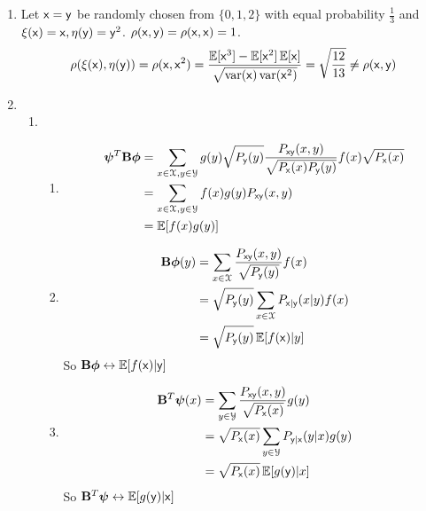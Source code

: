 \documentclass[a4paper]{article}
\begin{document}
\begin{enumerate}
  \item Let $\mathsf{x}=\mathsf{y}$ be randomly chosen from $\{0,1,2\}$ with equal probability $\frac{1}{3}$ and $\xi(\mathsf{x})=\mathsf{x},\eta(\mathsf{y}) = \mathsf{y}^2$. $\rho(\mathsf{x},\mathsf{y}) =\rho(\mathsf{x},\mathsf{x}) =1$. \begin{equation}
    \rho(\xi(\mathsf{x}),\eta(\mathsf{y})) = \rho(\mathsf{x},\mathsf{x}^2) = \frac{\operatorname{\mathbb{E}}[\mathsf{x}^3] - \operatorname{\mathbb{E}}[\mathsf{x}^2]\operatorname{\mathbb{E}}[\mathsf{x}]}{\sqrt{\operatorname{var}(\mathsf{x})\operatorname{var}(\mathsf{x}^2)}} = \sqrt{\frac{12}{13}} \neq \rho(\mathsf{x},\mathsf{y})
  \end{equation}

  \item \begin{enumerate}
    \item \begin{enumerate}
      \item \begin{equation}
        \begin{aligned}
          \bm{\psi}^T \mathbf{B} \bm{\phi} & =  \sum_{x\in \mathcal{X},y \in \mathcal{Y}} g(y) \sqrt{P_{\mathsf{y}}(y) } \frac{P_{\mathsf{x}\mathsf{y}}(x,y)}{\sqrt{P_{\mathsf{x}}(x)P_{\mathsf{y}}(y)}} f(x) \sqrt{P_{\mathsf{x}}(x)} \\
          & = \sum_{x\in \mathcal{X},y \in \mathcal{Y}} f(x) g(y) P_{\mathsf{x}\mathsf{y}}(x,y) \\
          & = \operatorname{\mathbb{E}}[f(x)g(y)]
        \end{aligned}
      \end{equation}
      \item \begin{equation}
        \begin{aligned}
          \mathbf{B} \bm{\phi}(y) & = \sum_{x\in \mathcal{X}} \frac{P_{\mathsf{x}\mathsf{y}}(x,y)}{\sqrt{P_{\mathsf{y}}(y)}} f(x) \\
          & =  \sqrt{P_{\mathsf{y}}(y)} \sum_{x\in \mathcal{X}} P_{\mathsf{x} | \mathsf{y}}(x|y) f(x) \\
          & = \sqrt{P_{\mathsf{y}}(y)} \operatorname{\mathbb{E}}[f(\mathsf{x}) | y]
        \end{aligned}
      \end{equation}
      So $\mathbf{B} \bm{\phi} \leftrightarrow \operatorname{\mathbb{E}}[f(\mathsf{x}) | \mathsf{y}]$
      \item  \begin{equation}
        \begin{aligned}
          \mathbf{B}^T \bm{\psi}(x) & = \sum_{y\in \mathcal{Y}} \frac{P_{\mathsf{x}\mathsf{y}}(x,y)}{\sqrt{P_{\mathsf{x}}(x)}} g(y) \\
          & =  \sqrt{P_{\mathsf{x}}(x)} \sum_{y\in \mathcal{Y}} P_{\mathsf{y} | \mathsf{x}}(y|x) g(y) \\
          & = \sqrt{P_{\mathsf{x}}(x)} \operatorname{\mathbb{E}}[g(\mathsf{y}) | x]
        \end{aligned}
      \end{equation}
      So $\mathbf{B}^T \bm{\psi} \leftrightarrow \operatorname{\mathbb{E}}[g(\mathsf{y}) | \mathsf{x}]$
    \end{enumerate}


\end{enumerate}
\end{enumerate}
\end{document}
